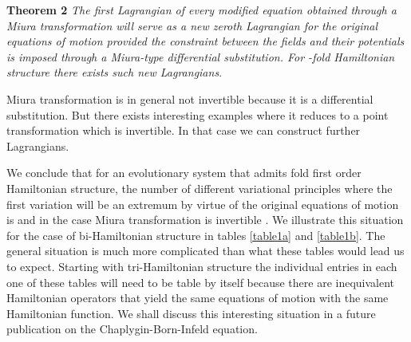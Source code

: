 \documentclass[a4paper,12pt]{article}
\begin{document}
{\bf Theorem 2} {\it The first Lagrangian of every modified
equation obtained through a Miura transformation will serve as a
new zeroth Lagrangian for the original equations of motion
provided the constraint between the fields and their potentials is
imposed through a Miura-type differential substitution. For
\coordHE{}-fold Hamiltonian structure there exists \coordHE{} such new
Lagrangians}.

Miura transformation is in general not invertible because it is a
differential substitution. But there exists interesting examples
where it reduces to a point transformation which is invertible. In
that case we can construct \coordHE{} further Lagrangians.

We conclude that for an evolutionary system that admits \coordHE{} fold
first order Hamiltonian structure, the number of different
variational principles where the first variation will be an
extremum by virtue of the original equations of motion is \coordHE{}
and in the case Miura transformation is invertible \coordHE{}. We
illustrate this situation for the case of bi-Hamiltonian structure
in tables \ref{table1a} and \ref{table1b}. The general situation
is much more complicated than what these tables would lead us to
expect. Starting with tri-Hamiltonian structure the individual
entries in each one of these tables will need to be table by
itself because there are inequivalent Hamiltonian operators that
yield the same equations of motion with the same Hamiltonian
function. We shall discuss this interesting situation in a future
publication on the Chaplygin-Born-Infeld equation.
\end{document}
